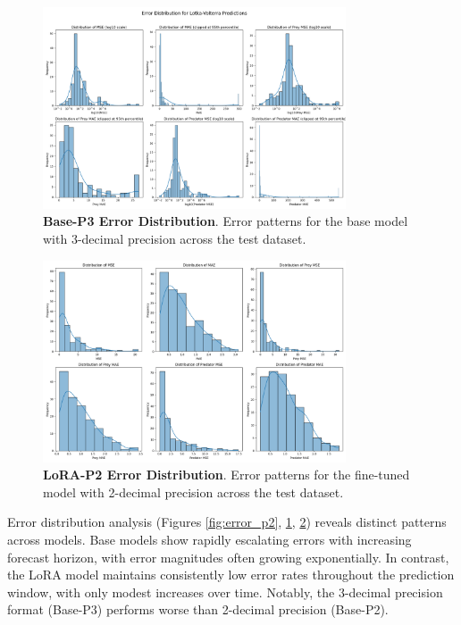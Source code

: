 \documentclass{article}
\begin{document}
\begin{figure}[H]
    \centering
    \includegraphics[width=0.8\textwidth]{error_distributions_p3}
    \caption{\textbf{Base-P3 Error Distribution}. Error patterns for the base model with 3-decimal precision across the test dataset.}
    \label{fig:error_p3}
\end{figure}

\begin{figure}[H]
    \centering
    \includegraphics[width=0.8\textwidth]{error_distributions_final}
    \caption{\textbf{LoRA-P2 Error Distribution}. Error patterns for the fine-tuned model with 2-decimal precision across the test dataset.}
    \label{fig:error_lora_p2}
\end{figure}

Error distribution analysis (Figures \ref{fig:error_p2}, \ref{fig:error_p3}, \ref{fig:error_lora_p2}) reveals distinct patterns across models. Base models show rapidly escalating errors with increasing forecast horizon, with error magnitudes often growing exponentially. In contrast, the LoRA model maintains consistently low error rates throughout the prediction window, with only modest increases over time. Notably, the 3-decimal precision format (Base-P3) performs worse than 2-decimal precision (Base-P2).
\end{document}
